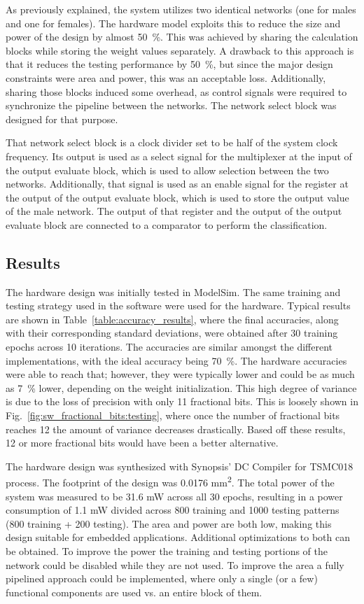 \documentclass[10pt,journal]{IEEEtran}
\newcommand{\fig}[1]{Fig.~\ref{#1}}
\newcommand{\tbl}[1]{Table~\ref{#1}}
\begin{document}
			As previously explained, the system utilizes two identical networks (one for males and one for females). The hardware model exploits this to reduce the size and power of the design by almost 50~\%. This was achieved by sharing the calculation blocks while storing the weight values separately. A drawback to this approach is that it reduces the testing performance by 50~\%, but since the major design constraints were area and power, this was an acceptable loss. Additionally, sharing those blocks induced some overhead, as control signals were required to synchronize the pipeline between the networks. The network select block was designed for that purpose.
			
			That network select block is a clock divider set to be half of the system clock frequency. Its output is used as a select signal for the multiplexer at the input of the output evaluate block, which is used to allow selection between the two networks. Additionally, that signal is used as an enable signal for the register at the output of the output evaluate block, which is used to store the output value of the male network. The output of that register and the output of the output evaluate block are connected to a comparator to perform the classification.
	
	\subsection{Results}
		The hardware design was initially tested in ModelSim. The same training and testing strategy used in the software were used for the hardware. Typical results are shown in \tbl{table:accuracy_results}, where the final accuracies, along with their corresponding standard deviations, were obtained after 30 training epochs across 10 iterations. The accuracies are similar amongst the different implementations, with the ideal accuracy being 70~\%. The hardware accuracies were able to reach that; however, they were typically lower and could be as much as 7~\% lower, depending on the weight initialization. This high degree of variance is due to the loss of precision with only 11 fractional bits. This is loosely shown in \fig{fig:sw_fractional_bits:testing}, where once the number of fractional bits reaches 12 the amount of variance decreases drastically. Based off these results, 12 or more fractional bits would have been a better alternative.
		
		The hardware design was synthesized with Synopsis' DC Compiler for TSMC018 process. The footprint of the design was 0.0176 mm\textsuperscript{2}. The total power of the system was measured to be 31.6 mW across all 30 epochs, resulting in a power consumption of 1.1 mW divided across 800 training and 1000 testing patterns (800 training + 200 testing). The area and power are both low, making this design suitable for embedded applications. Additional optimizations to both can be obtained. To improve the power the training and testing portions of the network could be disabled while they are not used. To improve the area a fully pipelined approach could be implemented, where only a single (or a few) functional components are used vs. an entire block of them.
		
\end{document}
